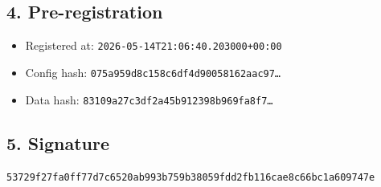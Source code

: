 \documentclass{article}
\begin{document}
\subsection*{4. Pre-registration}
\begin{itemize}
\item Registered at: \texttt{2026-05-14T21:06:40.203000+00:00}
\item Config hash: \texttt{075a959d8c158c6df4d90058162aac97\dots}
\item Data hash: \texttt{83109a27c3df2a45b912398b969fa8f7\dots}
\end{itemize}
\subsection*{5. Signature}
\texttt{53729f27fa0ff77d7c6520ab993b759b38059fdd2fb116cae8c66bc1a609747e}\\
\end{document}
